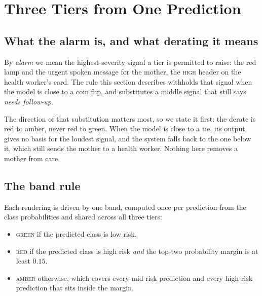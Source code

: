 \section{Three Tiers from One Prediction}
\label{sec:tiers}

\subsection{What the alarm is, and what derating it means}

By \emph{alarm} we mean the highest-severity signal a tier is permitted to
raise: the red lamp and the urgent spoken message for the mother, the
\textsc{high} header on the health worker's card. The rule this section
describes withholds that signal when the model is close to a coin flip, and
substitutes a middle signal that still says \emph{needs follow-up}.

The direction of that substitution matters most, so we state it first: the
derate is red to amber, never red to green. When the model is close to a tie,
its output gives no basis for the loudest signal, and the system falls back to
the one below it, which still sends the mother to a health worker. Nothing
here removes a mother from care.

\subsection{The band rule}
\label{sec:tiers-band}

Each rendering is driven by one band, computed once per prediction from the
class probabilities and shared across all three tiers:

\begin{itemize}
  \item \textsc{green} if the predicted class is low risk.
  \item \textsc{red} if the predicted class is high risk \emph{and} the
    top-two probability margin is at least $0.15$.
  \item \textsc{amber} otherwise, which covers every mid-risk prediction
    and every high-risk prediction that sits inside the margin.
\end{itemize}

